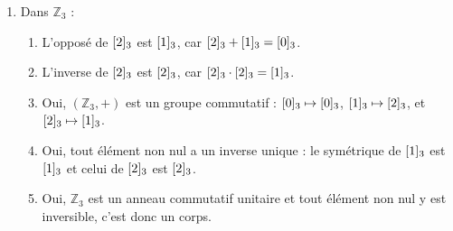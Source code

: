 \begin{enumerate}[label=\thechapter.\arabic*, font=\bfseries, itemsep=7mm,labelsep*=3mm,left=0mm]
\begin{enumerate}[label=\alph*),itemsep=5mm,left=-1mm,labelsep*=2mm]
\begin{minipage}[t]{0.48\linewidth}
\begin{tabular}{c|ccccc}
		$\cl[5]{3}$ & $\cl[5]{3}$ & $\cl[5]{4}$ & $\cl[5]{0}$ & $\cl[5]{1}$ & $\cl[5]{2}$ \\
		$\cl[5]{4}$ & $\cl[5]{4}$ & $\cl[5]{0}$ & $\cl[5]{1}$ & $\cl[5]{2}$ & $\cl[5]{3}$
	\end{tabular}
	\quad
	\begin{tabular}{c|ccccc}
		$\cdot$ & $\cl[5]{0}$ & $\cl[5]{1}$ & $\cl[5]{2}$ & $\cl[5]{3}$ & $\cl[5]{4}$ \\ \hline
		$\cl[5]{0}$ & $\cl[5]{0}$ & $\cl[5]{0}$ & $\cl[5]{0}$ & $\cl[5]{0}$ & $\cl[5]{0}$ \\
		$\cl[5]{1}$ & $\cl[5]{0}$ & $\cl[5]{1}$ & $\cl[5]{2}$ & $\cl[5]{3}$ & $\cl[5]{4}$ \\
		$\cl[5]{2}$ & $\cl[5]{0}$ & $\cl[5]{2}$ & $\cl[5]{4}$ & $\cl[5]{1}$ & $\cl[5]{3}$ \\
		$\cl[5]{3}$ & $\cl[5]{0}$ & $\cl[5]{3}$ & $\cl[5]{1}$ & $\cl[5]{4}$ & $\cl[5]{2}$ \\
		$\cl[5]{4}$ & $\cl[5]{0}$ & $\cl[5]{4}$ & $\cl[5]{3}$ & $\cl[5]{2}$ & $\cl[5]{1}$
	\end{tabular}
\end{minipage}

\vspace{0.4cm}

\item Dans $\mathbb{Z}_3$ :
\begin{enumerate}[label=\arabic*)]
	\item L'opposé de $\cl[3]{2}$ est $\cl[3]{1}$, car $\cl[3]{2} + \cl[3]{1} = \cl[3]{0}$.
	\item L'inverse de $\cl[3]{2}$ est $\cl[3]{2}$, car $\cl[3]{2} \cdot \cl[3]{2} = \cl[3]{1}$.
	\item Oui, $(\mathbb{Z}_3, +)$ est un groupe commutatif : $\cl[3]{0} \mapsto \cl[3]{0}$, $\cl[3]{1} \mapsto \cl[3]{2}$, et $\cl[3]{2} \mapsto \cl[3]{1}$.
	\item Oui, tout élément non nul a un inverse unique : le symétrique de $\cl[3]{1}$ est $\cl[3]{1}$ et celui de $\cl[3]{2}$ est $\cl[3]{2}$.
	\item Oui, $\mathbb{Z}_3$ est un anneau commutatif unitaire et tout élément non nul y est inversible, c'est donc un corps.
\end{enumerate}


\end{enumerate}
\end{enumerate}
